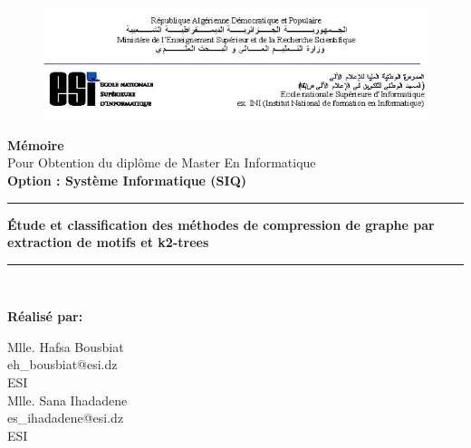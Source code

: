 \begin{titlepage}





	\begin{figure}[t]
		\includegraphics[scale=0.75]{./ressources/image/ESI.png}\\[0.6in]
	\end{figure}
	
	
	
	\begin{center}
	
		\LARGE \textbf{ Mémoire}\\
		\Large{
			Pour Obtention du diplôme de Master En Informatique\\
			\textbf{Option : Système Informatique (SIQ)}
		}\\[0.2in]
		\huge {
		\rule{\linewidth}{.5pt}
			\textbf{
				Étude et classification des méthodes de compression de graphe par extraction de motifs et k2-trees
			} 
			\rule{\linewidth}{.5pt}
		}\\[0.5in]
		\Large
	
	\textbf{Réalisé par:}\\
	\begin{multicols}{2}
			\Large 	Mlle. Hafsa Bousbiat\\
			\large eh\_bousbiat@esi.dz\\
			ESI\\
		\columnbreak
 			\Large Mlle. Sana Ihadadene\\
			\large es\_ihadadene@esi.dz\\
			ESI \\
		

\end{multicols}
\end{center}
\end{titlepage}
